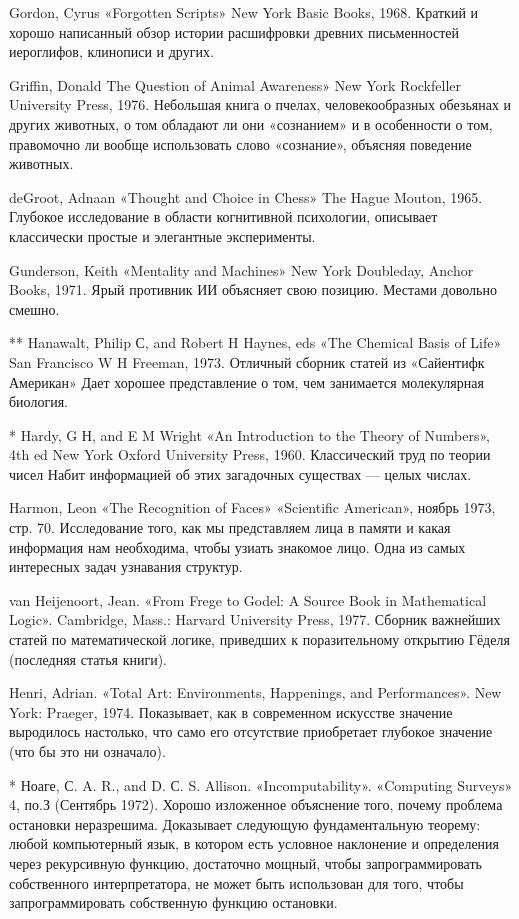 Gordon, Cyrus «Forgotten Scripts» New York Basic Books, 1968. Краткий и хорошо написанный обзор истории расшифровки древних письменностей иероглифов, клинописи и других.

Griffin, Donald The Question of Animal Awareness» New York Rockfeller University Press, 1976. Небольшая книга о пчелах, человекообразных обезьянах и других животных, о том обладают ли они «сознанием» и в особенности о том, правомочно ли вообще использовать слово «сознание», объясняя поведение животных.

deGroot, Adnaan «Thought and Choice in Chess» The Hague Mouton, 1965. Глубокое исследование в области когнитивной психологии, описывает классически простые и элегантные эксперименты.

Gunderson, Keith «Mentality and Machines» New York Doubleday, Anchor Books, 1971. Ярый противник ИИ объясняет свою позицию. Местами довольно смешно.

** Hanawalt, Philip С, and Robert H Haynes, eds «The Chemical Basis of Life» San Francisco W H Freeman, 1973. Отличный сборник статей из «Сайентифк Американ» Дает хорошее представление о том, чем занимается молекулярная биология.

* Hardy, G Н, and E M Wright «An Introduction to the Theory of Numbers», 4th ed New York Oxford University Press, 1960. Классический труд по теории чисел Набит информацией об этих загадочных существах --- целых числах.

Harmon, Leon «The Recognition of Faces» «Scientific American», ноябрь 1973, стр. 70. Исследование того, как мы представляем лица в памяти и какая информация нам необходима, чтобы узиать знакомое лицо. Одна из самых интересных задач узнавания структур.

van Heijenoort, Jean. «From Frege to Godel: A Source Book in Mathematical Logic». Cambridge, Mass.: Harvard University Press, 1977. Сборник важнейших статей по математической логике, приведших к поразительному открытию Гёделя (последняя статья книги).

Henri, Adrian. «Total Art: Environments, Happenings, and Performances». New York: Praeger, 1974. Показывает, как в современном искусстве значение выродилось настолько, что само его отсутствие приобретает глубокое значение (что бы это ни означало).

* Ноаге, С. A. R., and D. С. S. Allison. «Incomputability». «Computing Surveys» 4, по.З (Сентябрь 1972). Хорошо изложенное объяснение того, почему проблема остановки неразрешима. Доказывает следующую фундаментальную теорему: любой компьютерный язык, в котором есть условное наклонение и определения через рекурсивную функцию, достаточно мощный, чтобы запрограммировать собственного интерпретатора, не может быть использован для того, чтобы запрограммировать собственную функцию остановки.

